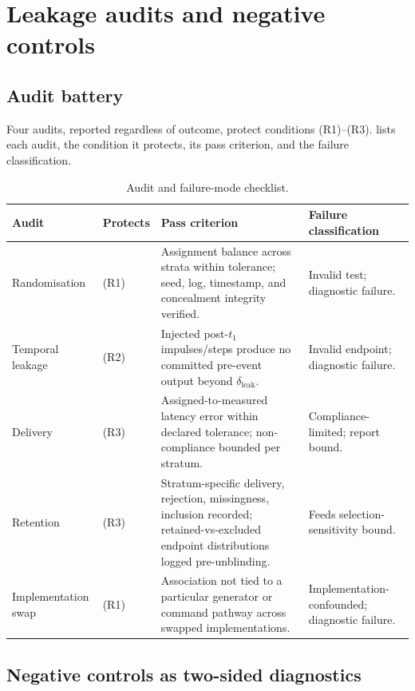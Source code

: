 \documentclass[11pt,a4paper]{article}
\theoremstyle{definition}
\begin{document}
\section{Leakage audits and negative controls}
\label{sec:si-leakage-controls}

\subsection{Audit battery}
\label{sec:si-audit-battery}

Four audits, reported regardless of outcome, protect conditions (R1)--(R3).
 lists each audit, the condition it protects, its pass
criterion, and the failure classification.

\begin{table}[t]
\centering
\caption{Audit and failure-mode checklist.}
\label{tab:si-audits}
\footnotesize
\begin{tabularx}{\textwidth}{@{}p{2.6cm}p{1.4cm}Xp{3.0cm}@{}}
\toprule
\textbf{Audit} & \textbf{Protects} & \textbf{Pass criterion} &
\textbf{Failure classification} \\
\midrule
Randomisation & (R1) & Assignment balance across strata within tolerance; seed,
log, timestamp, and concealment integrity verified. & Invalid test;
diagnostic failure. \\
Temporal leakage & (R2) & Injected post-\(t_1\) impulses/steps produce no
committed pre-event output beyond \(\delta_{\mathrm{leak}}\). & Invalid endpoint;
diagnostic failure. \\
Delivery & (R3) & Assigned-to-measured latency error within declared tolerance;
non-compliance bounded per stratum. & Compliance-limited; report bound. \\
Retention & (R3) & Stratum-specific delivery, rejection, missingness, inclusion
recorded; retained-vs-excluded endpoint distributions logged pre-unblinding. &
Feeds selection-sensitivity bound. \\
Implementation swap & (R1) & Association not tied to a particular generator or
command pathway across swapped implementations. & Implementation-confounded;
diagnostic failure. \\
\bottomrule
\end{tabularx}
\end{table}

\subsection{Negative controls as two-sided diagnostics}
\label{sec:si-negative-controls}
\end{document}
